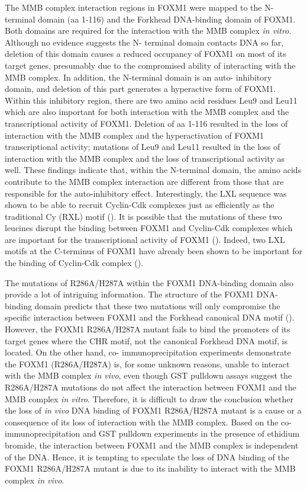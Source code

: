 The MMB complex interaction regions in FOXM1 were mapped to the N-terminal domain (aa 1-116) and the Forkhead DNA-binding domain of FOXM1. Both domains are required for the interaction with the MMB complex \textit{in vitro}. Although no evidence suggests the N- terminal domain contacts DNA so far, deletion of this domain causes a reduced occupancy of FOXM1 on most of its target genes, presumably due to the compromised ability of interacting with the MMB complex. In addition, the N-terminal domain is an auto- inhibitory domain, and deletion of this part generates a hyperactive form of FOXM1. Within this inhibitory region, there are two amino acid residues Leu9 and Leu11 which are also important for both interaction with the MMB complex and the transcriptional activity of FOXM1. Deletion of aa 1-116 resulted in the loss of interaction with the MMB complex and the hyperactivation of FOXM1 transcriptional activity; mutations of Leu9 and Leu11 resulted in the loss of interaction with the MMB complex and the loss of transcriptional activity as well. These findings indicate that, within the N-terminal domain, the amino acids contribute to the MMB complex interaction are different from those that are responsible for the auto-inhibitory effect. Interestingly, the LXL sequence was shown to be able to recruit Cyclin-Cdk complexes just as efficiently as the traditional Cy (RXL) motif (\cite{wohlschlegel2001mutational}). It is possible that the mutations of these two leucines disrupt the binding between FOXM1 and Cyclin-Cdk complexes which are important for the transcriptional activity of FOXM1 (\cite{wang2005forkhead,fu2008plk1-dependent}). Indeed, two LXL motifs at the C-terminus of FOXM1 have already been shown to be important for the binding of Cyclin-Cdk complex (\cite{wang2005forkhead,laoukili2008activation}).

The mutations of R286A/H287A within the FOXM1 DNA-binding domain also provide a lot of intriguing information. The structure of the FOXM1 DNA-binding domain predicts that these two mutations will only compromise the specific interaction between FOXM1 and the Forkhead canonical DNA motif (\cite{littler2010structure}). However, the FOXM1 R286A/H287A mutant fails to bind the promoters of its target genes where the CHR motif, not the canonical Forkhead DNA motif, is located. On the other hand, co- immunoprecipitation experiments demonstrate the FOXM1 (R286A/H287A) is, for some unknown reasons, unable to interact with the MMB complex \textit{in vivo}, even though GST pulldown assays suggest the R286A/H287A mutations do not affect the interaction between FOXM1 and the MMB complex \textit{in vitro}. Therefore, it is difficult to draw the conclusion whether the loss of \textit{in vivo} DNA binding of FOXM1 R286A/H287A mutant is a cause or a consequence of its loss of interaction with the MMB complex. Based on the co-immunoprecipitation and GST pulldown experiments in the presence of ethidium bromide, the interaction between FOXM1 and the MMB complex is independent of the DNA. Hence, it is tempting to speculate the loss of DNA binding of the FOXM1 R286A/H287A mutant is due to its inability to interact with the MMB complex \textit{in vivo}.

